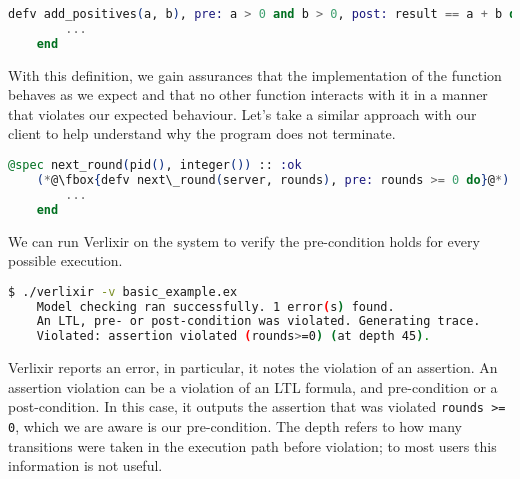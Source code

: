 \begin{lstlisting}[language=Elixir, xleftmargin=.0\linewidth, caption={Example usage of pre- and post-conditions in LTLixir}]
    defv add_positives(a, b), pre: a > 0 and b > 0, post: result == a + b do
        ...
    end
\end{lstlisting}
With this definition, we gain assurances that the implementation of the function behaves as we expect and that no other function interacts with it in a manner that violates our expected behaviour. Let's take a similar approach with our client to help understand why the program does not terminate.
\begin{lstlisting}[language=Elixir, xleftmargin=.3\linewidth]
    @spec next_round(pid(), integer()) :: :ok
    (*@\fbox{defv next\_round(server, rounds), pre: rounds >= 0 do}@*)
        ...
    end
\end{lstlisting}
We can run Verlixir on the system to verify the pre-condition holds for every possible execution.
\begin{lstlisting}[language=bash, xleftmargin=.1\linewidth]
    $ ./verlixir -v basic_example.ex
    Model checking ran successfully. 1 error(s) found.
    An LTL, pre- or post-condition was violated. Generating trace.
    Violated: assertion violated (rounds>=0) (at depth 45).
\end{lstlisting}
Verlixir reports an error, in particular, it notes the violation of an assertion. An assertion violation can be a violation of an LTL formula, and pre-condition or a post-condition. In this case, it outputs the assertion that was violated \texttt{rounds >= 0}, which we are aware is our pre-condition. The depth refers to how many transitions were taken in the execution path before violation; to most users this information is not useful.
